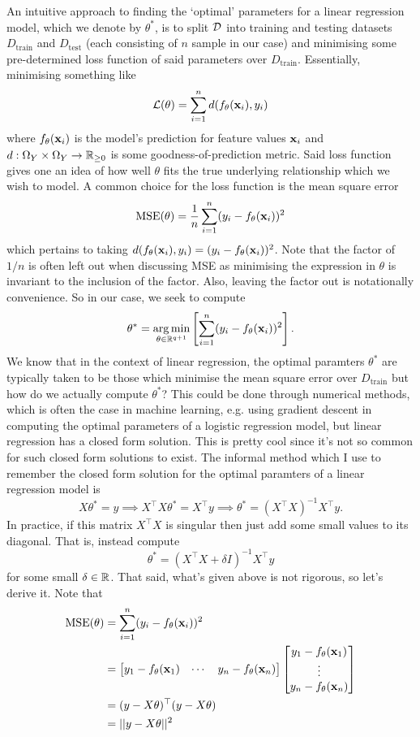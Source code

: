 \documentclass[11pt]{article}
\begin{document}
An intuitive approach to finding the `optimal' parameters for a linear regression model, which we denote by $\theta^{*}$, is to split $\mathcal{D}$ into training and testing datasets $D_{\text{train}}$ and $D_{\text{test}}$ (each consisting of $n$ sample in our case) and minimising some pre-determined loss function of said parameters over $D_{\text{train}}$. Essentially, minimising something like
$$
\mathcal{L}(\theta)=\sum_{i=1}^nd(f_{\theta}(\mathbf{x}_i), y_i)
$$
where $f_{\theta}(\mathbf{x}_i)$ is the model's prediction for feature values $\mathbf{x}_i$ and $d:\Omega_Y\times\Omega_Y\rightarrow\mathbb{R}_{\geq0}$ is some goodness-of-prediction metric. Said loss function gives one an idea of how well $\theta$ fits the true underlying relationship which we wish to model. A common choice for the loss function is the mean square error
$$
\text{MSE}(\theta)=\frac{1}{n}\sum_{i=1}^n(y_i-f_{\theta}(\mathbf{x}_i))^2
$$
which pertains to taking $d(f_{\theta}(\mathbf{x}_i), y_i)=(y_i-f_{\theta}(\mathbf{x}_i))^2$. Note that the factor of $1/n$ is often left out when discussing MSE as minimising the expression in $\theta$ is invariant to the inclusion of the factor. Also, leaving the factor out is notationally convenience. So in our case, we seek to compute
$$
\theta^{*}=\operatorname*{arg\,min}_{\theta\in\mathbb{R}^{q+1}}\left[\sum_{i=1}^n(y_i-f_{\theta}(\mathbf{x}_i))^2\right].
$$
We know that in the context of linear regression, the optimal paramters $\theta^{*}$ are typically taken to be those which minimise the mean square error over $D_{\text{train}}$ but how do we actually compute $\theta^{*}$? This could be done through numerical methods, which is often the case in machine learning, e.g. using gradient descent in computing the optimal parameters of a logistic regression model, but linear regression has a closed form solution. This is pretty cool since it's not so common for such closed form solutions to exist. The informal method which I use to remember the closed form solution for the optimal paramters of a linear regression model is
$$
X\theta^{*}=y \implies X^{\top}X\theta^{*}=X^{\top}y \implies \theta^{*}=(X^{\top}X)^{-1}X^{\top}y.
$$
In practice, if this matrix $X^{\top}X$ is singular then just add some small values to its diagonal. That is, instead compute
$$
\theta^{*}=(X^{\top}X+\delta I)^{-1}X^{\top}y
$$
for some small $\delta\in\mathbb{R}$. That said, what's given above is not rigorous, so let's derive it. Note that
\begin{align*}
    \text{MSE}(\theta)
    &=
    \sum_{i=1}^n(y_i-f_{\theta}(\mathbf{x}_i))^2\\
    &=
    \begin{bmatrix}
        y_1-f_{\theta}(\mathbf{x}_1) & \cdots & y_n-f_{\theta}(\mathbf{x}_n)
    \end{bmatrix}
    \begin{bmatrix}
        y_1-f_{\theta}(\mathbf{x}_1)\\
        \vdots\\
        y_n-f_{\theta}(\mathbf{x}_n)
    \end{bmatrix}\\
    &=(y-X\theta)^{\top}(y-X\theta)\\
    &=||y-X\theta||^2
\end{align*}
\end{document}
